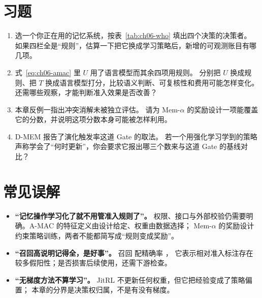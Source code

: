 \section*{习题}
\begin{enumerate}[label=6-\arabic*.,ref=6-\arabic*]
  \item\label{ex:ch06-1} 选一个你正在用的记忆系统，按表~\ref{tab:ch06-who} 填出四个决策的决策者。
        如果四栏全是“规则”，估算一下把它换成学习策略后，新增的可观测账目有哪几项。
  \item\label{ex:ch06-2} 式~\eqref{eq:ch06-amac} 里 $U$ 用了语言模型而其余四项用规则。
        分别把 $U$ 换成规则、把 $T$ 换成语言模型打分，比较语义判断、可复核性和费用可能怎样变化。还需哪些观察，才能判断准入效果是否改善？
  \item\label{ex:ch06-3} 本章反例一指出冲突消解未被独立评估。
        请为 Mem-$\alpha$ 的奖励设计一项能覆盖它的分数，并说明这项分数本身可能被怎样利用。
  \item\label{ex:ch06-4} D-MEM 报告了演化触发率这道 Gate 的取法。
        若一个用强化学习学到的策略声称学会了“何时更新”，你会要求它报出哪三个数来与这道 Gate 的基线对比？
\end{enumerate}

\section*{常见误解}
\begin{itemize}
  \item \textbf{“记忆操作学习化了就不用管准入规则了”。}
        权限、接口与外部校验仍需要明确。A-MAC 的特征定义由设计给定、权重由数据选择；
        Mem-$\alpha$ 的奖励设计约束策略训练，两者不能都简写成“规则变成奖励”。
  \item \textbf{“召回高说明记得全，是好事”。}
        召回  配精确率 \cite{amac-2603}，
        它表示相对准入标注存在较多假阳性；是否损害后续使用，还需下游检查。
  \item \textbf{“无梯度方法不算学习”。}
        JitRL 不更新任何权重，但它把经验变成了策略偏置\cite{jitrl-2601}；
        本章的分界是决策权归属，不是有没有梯度。
\end{itemize}

